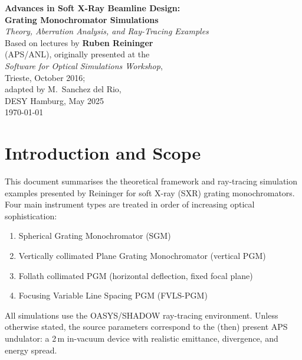 \documentclass[12pt,a4paper]{article}
\begin{document}
\begin{titlepage}
  \centering
  \vspace*{2cm}
  {\huge\bfseries Advances in Soft X-Ray Beamline Design:\\[0.4em]
   Grating Monochromator Simulations}\\[1.5em]
  {\large\itshape Theory, Aberration Analysis, and Ray-Tracing Examples}\\[2em]
  {\normalsize Based on lectures by \textbf{Ruben Reininger}\\
   (APS/ANL), originally presented at the\\
   \textit{Software for Optical Simulations Workshop},\\
   Trieste, October 2016;\\
   adapted by M.\ Sanchez del Rio,\\
   DESY Hamburg, May 2025}\\[4em]
  {\normalsize\today}
  \vfill
\end{titlepage}

\tableofcontents
\newpage

\section{Introduction and Scope}

This document summarises the theoretical framework and ray-tracing simulation examples
presented by Reininger for soft X-ray (SXR) grating monochromators.  Four main instrument
types are treated in order of increasing optical sophistication:

\begin{enumerate}
  \item Spherical Grating Monochromator (SGM)
  \item Vertically collimated Plane Grating Monochromator (vertical PGM)
  \item Follath collimated PGM (horizontal deflection, fixed focal plane)
  \item Focusing Variable Line Spacing PGM (FVLS-PGM)
\end{enumerate}

All simulations use the OASYS/SHADOW ray-tracing environment.  Unless otherwise stated,
the source parameters correspond to the (then) present APS undulator: a 2\,m in-vacuum
device with realistic emittance, divergence, and energy spread.

\end{document}
